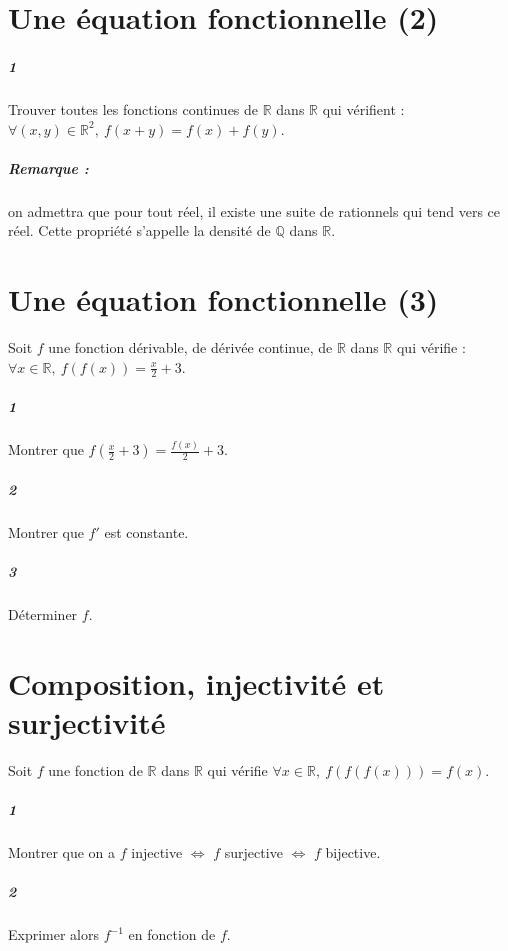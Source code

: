 \documentclass[10pt,a4paper]{article}
\begin{document}
\section{Une équation fonctionnelle (2)}
\subparagraph{1}Trouver toutes les fonctions continues de $\mathbb{R}$ dans $\mathbb{R}$ qui vérifient : $\forall (x,y) \in \mathbb{R}^2, \ f(x+y)=f(x)+f(y)$.
\subparagraph{Remarque :} on admettra que pour tout réel, il existe une suite de rationnels qui tend vers ce réel. Cette propriété s'appelle la densité de $\mathbb{Q}$ dans $\mathbb{R}$.

\section{Une équation fonctionnelle (3)}
Soit $f$ une fonction dérivable, de dérivée continue, de $\mathbb{R}$ dans $\mathbb{R}$ qui vérifie : $\forall x \in \mathbb{R}, \ f(f(x))=\frac{x}{2}+3$.
\subparagraph{1}Montrer que $f(\frac{x}{2}+3)=\frac{f(x)}{2}+3$.
\subparagraph{2}Montrer que $f'$ est constante.
\subparagraph{3}Déterminer $f$.

\section{Composition, injectivité et surjectivité}
Soit $f$ une fonction de $\mathbb{R}$ dans $\mathbb{R}$ qui vérifie $\forall x \in \mathbb{R}, \ f(f(f(x)))=f(x)$.
\subparagraph{1} Montrer que on a $f$ injective $\Leftrightarrow$ $f$ surjective $\Leftrightarrow$ $f$ bijective.
\subparagraph{2} Exprimer alors $f^{-1}$ en fonction de $f$.
\end{document}

